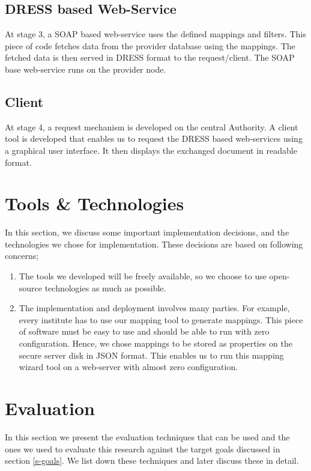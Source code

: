 \documentclass[12pt,a4paper,oneside]{book}
\begin{document}
\subsection{DRESS based Web-Service}
At stage 3, a SOAP based web-service uses the defined mappings and filters. This piece of code fetches data from the provider database using the mappings. The fetched data is then served in DRESS format to the  request/client. The SOAP base web-service runs on the provider node. 

\subsection{Client}
At stage 4, a request mechanism is developed on the central Authority. A client tool is developed that enables us to request the DRESS based web-services using a graphical user interface. It then displays the exchanged document in readable format.

\section{Tools \& Technologies}
In this section, we discuss some important implementation decisions, and the technologies we chose for implementation. These decisions are based on following concerns;

\begin{enumerate}

\item The tools we developed will be freely available, so we choose to use open-source technologies as much as possible.

\item The implementation and deployment involves many parties. For example, every institute has to use our mapping tool to generate mappings. This piece of software must be easy to use and should be able to run with zero configuration. Hence, we chose mappings to be stored as properties on the secure server disk in JSON format. This enables us to run this mapping wizard tool on a web-server with almost zero configuration.	

\end{enumerate}

\section{Evaluation}
In this section we present the evaluation techniques that can be used and the ones we used to evaluate this research against the target goals discussed in section \ref{s-goals}. We list down these techniques and later discuss these in detail.
\end{document}

